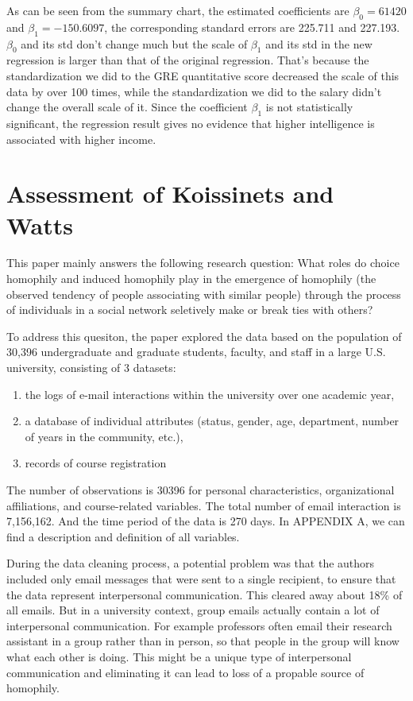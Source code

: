 \documentclass[11pt]{article}
\begin{document}
    As can be seen from the summary chart, the estimated coefficients are
\(\beta_0=61420\) and \(\beta_1=-150.6097\), the corresponding standard
errors are 225.711 and 227.193. \(\beta_0\) and its std don't change
much but the scale of \(\beta_1\) and its std in the new regression is
larger than that of the original regression. That's because the
standardization we did to the GRE quantitative score decreased the scale
of this data by over 100 times, while the standardization we did to the
salary didn't change the overall scale of it. Since the coefficient
\(\beta_1\) is not statistically significant, the regression result
gives no evidence that higher intelligence is associated with higher
income.

    \section{Assessment of Koissinets and
Watts}\label{assessment-of-koissinets-and-watts}

    This paper mainly answers the following research question: What roles do
choice homophily and induced homophily play in the emergence of
homophily (the observed tendency of people associating with similar
people) through the process of individuals in a social network
seletively make or break ties with others?

To address this quesiton, the paper explored the data based on the
population of 30,396 undergraduate and graduate students, faculty, and
staff in a large U.S. university, consisting of 3 datasets:

\begin{enumerate}
\def\labelenumi{\arabic{enumi}.}
\item
  the logs of e-mail interactions within the university over one
  academic year,
\item
  a database of individual attributes (status, gender, age, department,
  number of years in the community, etc.),
\item
  records of course registration
\end{enumerate}

The number of observations is 30396 for personal characteristics,
organizational affiliations, and course-related variables. The total
number of email interaction is 7,156,162. And the time period of the
data is 270 days. In APPENDIX A, we can find a description and
definition of all variables.

During the data cleaning process, a potential problem was that the
authors included only email messages that were sent to a single
recipient, to ensure that the data represent interpersonal
communication. This cleared away about 18\% of all emails. But in a
university context, group emails actually contain a lot of interpersonal
communication. For example professors often email their research
assistant in a group rather than in person, so that people in the group
will know what each other is doing. This might be a unique type of
interpersonal communication and eliminating it can lead to loss of a
propable source of homophily.
\end{document}
